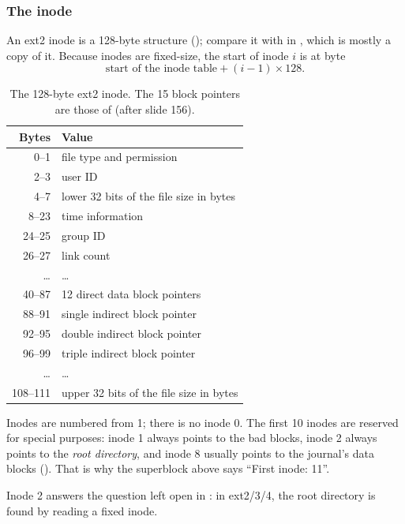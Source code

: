 \subsubsection{The inode}
An ext2 inode is a 128-byte structure (); compare it with  in , which is mostly a copy of it. Because inodes are fixed-size, the start of inode $i$ is at byte
\[
  \text{start of the inode table} + (i - 1) \times 128.
\]

\begin{table}[htbp]
\centering
\small
\begin{tabular}{rl}
  \toprule
  Bytes & Value \\
  \midrule
  0--1 & file type and permission \\
  2--3 & user ID \\
  4--7 & lower 32 bits of the file size in bytes \\
  8--23 & time information \\
  24--25 & group ID \\
  26--27 & link count \\
  \dots & \dots \\
  40--87 & 12 direct data block pointers \\
  88--91 & single indirect block pointer \\
  92--95 & double indirect block pointer \\
  96--99 & triple indirect block pointer \\
  \dots & \dots \\
  108--111 & upper 32 bits of the file size in bytes \\
  \bottomrule
\end{tabular}
\caption{The 128-byte ext2 inode. The 15 block pointers are those of  (after slide 156).}
\label{tab:inode}
\end{table}

\begin{definition}
  Inodes are numbered from 1; there is no inode 0. The first 10 inodes are reserved for special purposes: inode 1 always points to the bad blocks, inode 2 always points to the \emph{root directory}, and inode 8 usually points to the journal's data blocks (). That is why the superblock above says ``First inode: 11''.
\end{definition}

Inode 2 answers the question left open in : in ext2/3/4, the root directory is found by reading a fixed inode.

